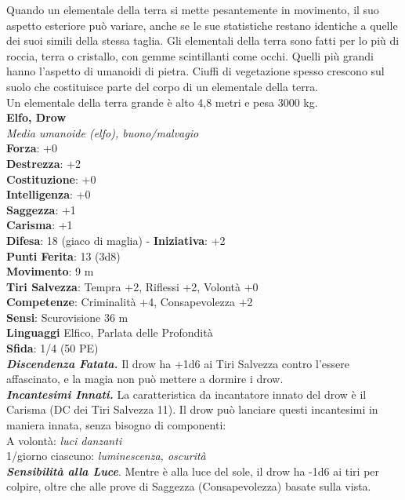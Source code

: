 \begin{multicols}{2}
Quando un elementale della terra si mette pesantemente in movimento, il suo aspetto esteriore può variare, anche se le sue statistiche restano identiche a quelle dei suoi simili della stessa taglia. Gli elementali della terra sono fatti per lo più di roccia, terra o cristallo, con gemme scintillanti come occhi. Quelli più grandi hanno l'aspetto di umanoidi di pietra. Ciuffi di vegetazione spesso crescono sul suolo che costituisce parte del corpo di un elementale della terra.\\

Un elementale della terra grande è alto 4,8 metri e pesa 3000 kg.\\

\medskip\textbf{Elfo, Drow}\\
\emph{Media umanoide (elfo), buono/malvagio}\\
\textbf{Forza}: +0\\
\textbf{Destrezza}: +2\\
\textbf{Costituzione}: +0\\
\textbf{Intelligenza}: +0\\
\textbf{Saggezza}: +1\\
\textbf{Carisma}: +1\\
\textbf{Difesa}: 18 (giaco di maglia) - \textbf{Iniziativa}: +2\\
\textbf{Punti Ferita}: 13 (3d8)\\
\textbf{Movimento}: 9 m\\
\textbf{Tiri Salvezza}: Tempra +2, Riflessi +2, Volontà +0\\
\textbf{Competenze}: Criminalità +4, Consapevolezza +2\\
\textbf{Sensi}: Scurovisione 36 m\\
\textbf{Linguaggi} Elfico, Parlata delle Profondità\\
\textbf{Sfida}: 1/4 (50 PE)\smallskip\\
\emph{\textbf{Discendenza Fatata.}} Il drow ha +1d6 ai Tiri Salvezza contro l'essere affascinato, e la magia non può mettere a dormire i drow.\\
\emph{\textbf{Incantesimi Innati.}} La caratteristica da incantatore innato del drow è il Carisma (DC dei Tiri Salvezza 11). Il drow può lanciare questi incantesimi in maniera innata, senza bisogno di componenti:\\
A volontà: \emph{luci danzanti}\\
1/giorno ciascuno: \emph{luminescenza, oscurità}\\
\emph{\textbf{Sensibilità alla Luce}}. Mentre è alla luce del sole, il drow ha -1d6 ai tiri per colpire, oltre che alle prove di Saggezza (Consapevolezza) basate sulla vista.\\

\end{multicols}

